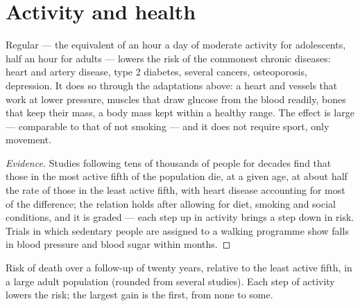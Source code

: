 \section{Activity and health}

\begin{proposition}\label{prop:g10:sport-and-health:health}
Regular  --- the equivalent of an hour a day of
moderate activity for adolescents, half an hour for adults --- lowers
the risk of the commonest chronic diseases: heart and artery disease,
type 2 diabetes, several cancers, osteoporosis, depression. It does so
through the adaptations above: a heart and vessels that work at lower
pressure, muscles that draw glucose from the blood readily, bones that
keep their mass, a body mass kept within a healthy range. The effect
is large --- comparable to that of not smoking --- and it does not
require sport, only movement.
\end{proposition}
\begin{proof}[Evidence]
Studies following tens of thousands of people for decades find that
those in the most active fifth of the population die, at a given age,
at about half the rate of those in the least active fifth, with heart
disease accounting for most of the difference; the relation holds
after allowing for diet, smoking and social conditions, and it is
graded --- each step up in activity brings a step down in risk. Trials
in which sedentary people are assigned to a walking programme show
falls in blood pressure and blood sugar within months.
\end{proof}

\begin{omfigure}

{\small Risk of death over a follow-up of twenty years, relative to the
least active fifth, in a large adult population (rounded from several
studies). Each step of activity lowers the risk; the largest gain is
the first, from none to some.}
\end{omfigure}

